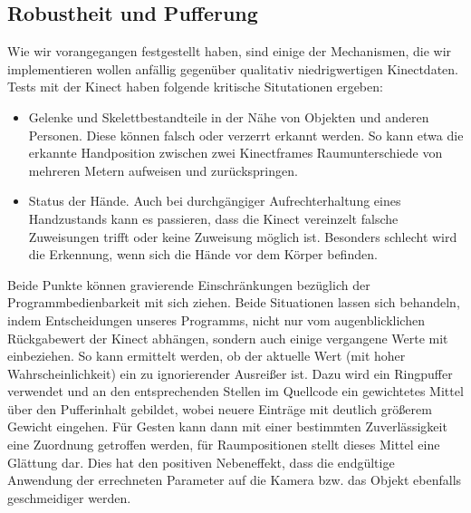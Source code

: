 	\subsection{Robustheit und Pufferung}\label{sec:robustheit}
	Wie wir vorangegangen festgestellt haben, sind einige der Mechanismen, die wir implementieren wollen anfällig gegenüber qualitativ niedrigwertigen Kinectdaten. Tests mit der Kinect haben folgende kritische Situtationen ergeben:
	\begin{itemize}
		\item Gelenke und Skelettbestandteile in der Nähe von Objekten und anderen Personen. Diese können falsch oder verzerrt erkannt werden. So kann etwa die erkannte Handposition zwischen zwei Kinectframes Raumunterschiede von mehreren Metern aufweisen und zurückspringen.
		\item Status der Hände. Auch bei durchgängiger Aufrechterhaltung eines Handzustands kann es passieren, dass die Kinect vereinzelt falsche Zuweisungen trifft oder keine Zuweisung möglich ist. Besonders schlecht wird die Erkennung, wenn sich die Hände vor dem Körper befinden.
	\end{itemize}
	Beide Punkte können gravierende Einschränkungen bezüglich der Programmbedienbarkeit mit sich ziehen.
	Beide Situationen lassen sich behandeln, indem Entscheidungen unseres Programms, nicht nur vom augenblicklichen Rückgabewert der Kinect abhängen, sondern auch einige vergangene Werte mit einbeziehen. So kann ermittelt werden, ob der aktuelle Wert (mit hoher Wahrscheinlichkeit) ein zu ignorierender Ausreißer ist. Dazu wird ein Ringpuffer verwendet und an den entsprechenden Stellen im Quellcode ein gewichtetes Mittel über den Pufferinhalt gebildet, wobei neuere Einträge mit deutlich größerem Gewicht eingehen. Für Gesten kann dann mit einer bestimmten Zuverlässigkeit eine Zuordnung getroffen werden, für Raumpositionen stellt dieses Mittel eine Glättung dar. Dies hat den positiven Nebeneffekt, dass die endgültige Anwendung der errechneten Parameter auf die Kamera bzw. das Objekt ebenfalls geschmeidiger werden.